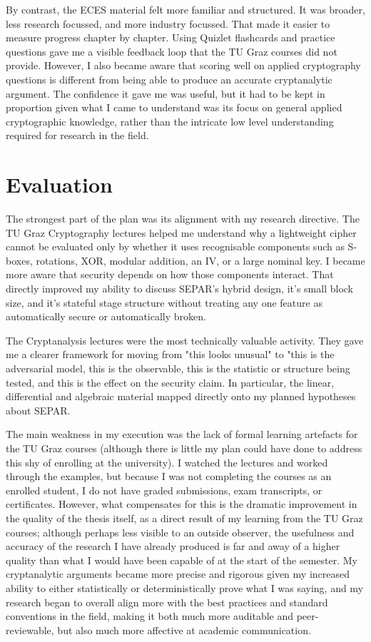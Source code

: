 \documentclass[11pt]{article}
\begin{document}
By contrast, the ECES material felt more familiar and structured. It was broader, less research focussed, and more industry focussed. That made it easier to measure progress chapter by chapter. Using Quizlet flashcards and practice questions gave me a visible feedback loop that the TU Graz courses did not provide. However, I also became aware that scoring well on applied cryptography questions is different from being able to produce an accurate cryptanalytic argument. The confidence it gave me was useful, but it had to be kept in proportion given what I came to understand was its focus on general applied cryptographic knowledge, rather than the intricate low level understanding required for research in the field.

\section*{Evaluation}

The strongest part of the plan was its alignment with my research directive. The TU Graz Cryptography lectures helped me understand why a lightweight cipher cannot be evaluated only by whether it uses recognisable components such as S-boxes, rotations, XOR, modular addition, an IV, or a large nominal key. I became more aware that security depends on how those components interact. That directly improved my ability to discuss SEPAR's hybrid design, it's small block size, and it's stateful stage structure without treating any one feature as automatically secure or automatically broken.

The Cryptanalysis lectures were the most technically valuable activity. They gave me a clearer framework for moving from "this looks unusual" to "this is the adversarial model, this is the observable, this is the statistic or structure being tested, and this is the effect on the security claim. In particular, the linear, differential and algebraic material mapped directly onto my planned hypotheses about SEPAR.

The main weakness in my execution was the lack of formal learning artefacts for the TU Graz courses (although there is little my plan could have done to address this shy of enrolling at the university). I watched the lectures and worked through the examples, but because I was not completing the courses as an enrolled student, I do not have graded submissions, exam transcripts, or certificates. However, what compensates for this is the dramatic improvement in the quality of the thesis itself, as a direct result of my learning from the TU Graz courses;
although perhaps less visible to an outside observer, the usefulness and accuracy of the research I have already produced is far and away of a higher quality than what I would have been capable of at the start of the semester. My cryptanalytic arguments became more precise and rigorous given my increased ability to either statistically or deterministically prove what I was saying, and my research began to overall align more with the best practices and standard conventions in the field, making it both much more auditable and peer-reviewable, but also much more affective at academic communication.
\end{document}
